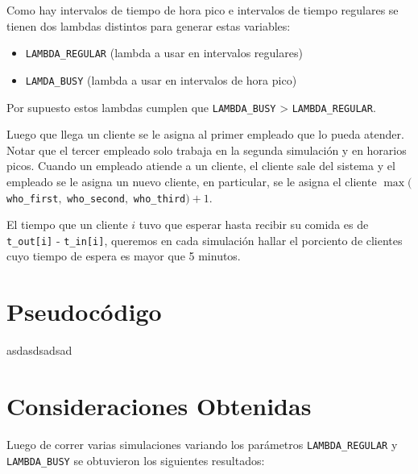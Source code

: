 \documentclass{article}
\begin{document}
        Como hay intervalos de tiempo de hora pico e intervalos de tiempo regulares se tienen dos lambdas distintos para generar
        estas variables:
            \begin{itemize}[label=\textbullet]
                \item \texttt{LAMBDA\_REGULAR} (lambda a usar en intervalos regulares)
                \item \texttt{LAMDA\_BUSY} (lambda a usar en intervalos de hora pico)
            \end{itemize}

        Por supuesto estos lambdas cumplen que \texttt{LAMBDA\_BUSY} > \texttt{LAMBDA\_REGULAR}.

        Luego que llega un cliente se le asigna al primer empleado que lo pueda atender. Notar que el tercer empleado solo
        trabaja en la segunda simulación y en horarios picos. Cuando un empleado atiende a un cliente, el cliente sale del sistema y
        el empleado se le asigna un nuevo cliente, en particular, se le asigna el cliente $\max($\texttt{who\_first}$,$ \texttt{who\_second}$,$ \texttt{who\_third}$) + 1$.

        El tiempo que un cliente $i$ tuvo que esperar hasta recibir su comida es de \texttt{t\_out[i]} - \texttt{t\_in[i]}, queremos en cada simulación
        hallar el porciento de clientes cuyo tiempo de espera es mayor que 5 minutos.

    \section*{Pseudocódigo}
            asdasdsadsad

    \section*{Consideraciones Obtenidas}
        Luego de correr varias simulaciones variando los parámetros \texttt{LAMBDA\_REGULAR} y \texttt{LAMBDA\_BUSY} se obtuvieron los siguientes resultados:
\end{document}
